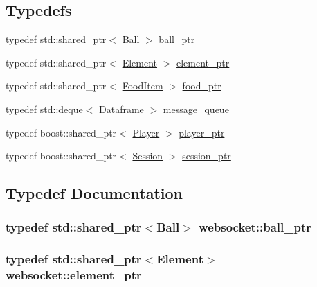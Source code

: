 \subsection*{Typedefs}
\begin{DoxyCompactItemize}
\item 
typedef std\+::shared\+\_\+ptr$<$ \hyperlink{classwebsocket_1_1Ball}{Ball} $>$ \hyperlink{namespacewebsocket_aae1d9cf317a0fb0b83bdfc2f92df77c7}{ball\+\_\+ptr}
\item 
typedef std\+::shared\+\_\+ptr$<$ \hyperlink{classwebsocket_1_1Element}{Element} $>$ \hyperlink{namespacewebsocket_a1f36ba91b301b228fa9e9f812883050c}{element\+\_\+ptr}
\item 
typedef std\+::shared\+\_\+ptr$<$ \hyperlink{classwebsocket_1_1FoodItem}{Food\+Item} $>$ \hyperlink{namespacewebsocket_a198017789b8c5fa32315a12d5ce97869}{food\+\_\+ptr}
\item 
typedef std\+::deque$<$ \hyperlink{structwebsocket_1_1Dataframe}{Dataframe} $>$ \hyperlink{namespacewebsocket_ae3fdf29bb367b5baf5be703253a4edfa}{message\+\_\+queue}
\item 
typedef boost\+::shared\+\_\+ptr$<$ \hyperlink{classwebsocket_1_1Player}{Player} $>$ \hyperlink{namespacewebsocket_aec8d52893bdf524a1412533a63b006a3}{player\+\_\+ptr}
\item 
typedef boost\+::shared\+\_\+ptr$<$ \hyperlink{classwebsocket_1_1Session}{Session} $>$ \hyperlink{namespacewebsocket_a12d8500a66e77dc9bfbff046b86714d8}{session\+\_\+ptr}
\end{DoxyCompactItemize}


\subsection{Typedef Documentation}
\subsubsection[{\texorpdfstring{ball\+\_\+ptr}{ball_ptr}}]{\setlength{\rightskip}{0pt plus 5cm}typedef std\+::shared\+\_\+ptr$<${\bf Ball}$>$ {\bf websocket\+::ball\+\_\+ptr}}\hypertarget{namespacewebsocket_aae1d9cf317a0fb0b83bdfc2f92df77c7}{}\label{namespacewebsocket_aae1d9cf317a0fb0b83bdfc2f92df77c7}
\subsubsection[{\texorpdfstring{element\+\_\+ptr}{element_ptr}}]{\setlength{\rightskip}{0pt plus 5cm}typedef std\+::shared\+\_\+ptr$<${\bf Element}$>$ {\bf websocket\+::element\+\_\+ptr}}\hypertarget{namespacewebsocket_a1f36ba91b301b228fa9e9f812883050c}{}\label{namespacewebsocket_a1f36ba91b301b228fa9e9f812883050c}
